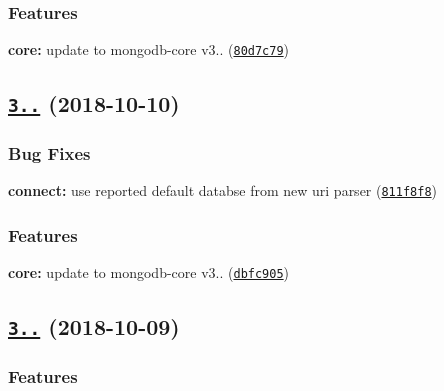 \subsubsection*{Features}


\begin{DoxyItemize}
\item {\bfseries core\+:} update to mongodb-\/core v3.. (\href{https://github.com/mongodb/node-mongodb-native/commit/80d7c79}{\tt 80d7c79})
\end{DoxyItemize}

\label{_3.1.8}%
 \subsection*{\href{https://github.com/mongodb/node-mongodb-native/compare/v3.1.7...v3.1.8}{\tt 3..} (2018-\/10-\/10)}

\subsubsection*{Bug Fixes}


\begin{DoxyItemize}
\item {\bfseries connect\+:} use reported default databse from new uri parser (\href{https://github.com/mongodb/node-mongodb-native/commit/811f8f8}{\tt 811f8f8})
\end{DoxyItemize}

\subsubsection*{Features}


\begin{DoxyItemize}
\item {\bfseries core\+:} update to mongodb-\/core v3.. (\href{https://github.com/mongodb/node-mongodb-native/commit/dbfc905}{\tt dbfc905})
\end{DoxyItemize}

\label{_3.1.7}%
 \subsection*{\href{https://github.com/mongodb/node-mongodb-native/compare/v3.1.6...v3.1.7}{\tt 3..} (2018-\/10-\/09)}

\subsubsection*{Features}


